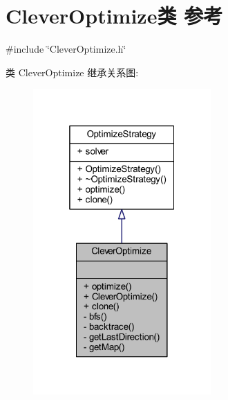 \hypertarget{classCleverOptimize}{}\section{Clever\+Optimize类 参考}
\label{classCleverOptimize}


{\ttfamily \#include \char`\"{}Clever\+Optimize.\+h\char`\"{}}



类 Clever\+Optimize 继承关系图\+:
\nopagebreak
\begin{figure}[H]
\begin{center}
\leavevmode
\includegraphics[width=193pt]{classCleverOptimize__inherit__graph}
\end{center}
\end{figure}


